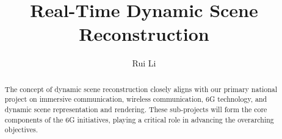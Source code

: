 \documentclass[lettersize,journal,onecolumn]{IEEEtran}
\begin{document}
\title{Real-Time Dynamic Scene Reconstruction}

\author{Rui Li}



\maketitle

\def\eg{\emph{e.g.}}
\def\Eg{\emph{E.g.}}
\def\etal{\emph{et al.}}

\newcommand\todo[1]{{\color{orange}TODO: #1}}
\newcommand\revised[1]{{\color{red}#1}}
\newcommand\idea[1]{{\color{blue}IDEA:#1}}
\newcommand\eqnref[1]{Eqn.~(\ref{#1})}
\newcommand\figref[1]{Fig.~(\ref{#1})}
\newcommand\secref[1]{Sec.~\ref{#1}}
\newcommand\tabref[1]{Tab.~\ref{#1}}

\newcommand{\T}{\mathbf{T}}
\newcommand{\svl}{\hat{\mathbf{s}}} %
\newcommand{\svg}{\mathbf{s}} %
\newcommand{\svt}{\mathbf{S}} %
\newcommand\mm[1]{\mathcal{#1}}
\newcommand\sv[1]{\mathcal{#1}}
\newcommand{\note}[1]{{\em{\textcolor{orange}{#1}}}}

\begin{abstract}
The concept of dynamic scene reconstruction closely aligns with our primary national project on immersive communication, wireless communication, 6G technology, and dynamic scene representation and rendering. These sub-projects will form the core components of the 6G initiatives, playing a critical role in advancing the overarching objectives.
\end{abstract}




%

%
%
%
%
%
%
%
%
%
%
%	
%	
\vfill
\end{document}
